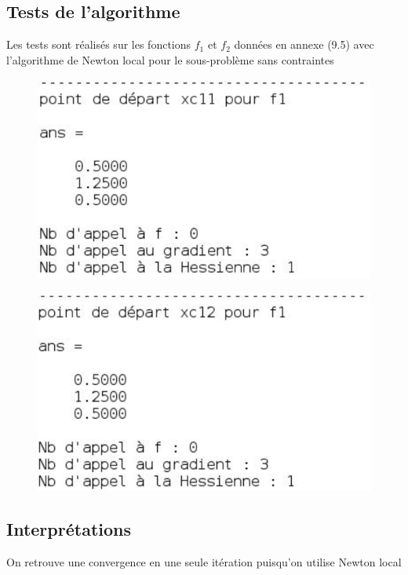 \documentclass[a4paper,12pt]{article}
\theoremstyle{break}
\begin{document}
\subsection{Tests de l'algorithme}
Les tests sont réalisés sur les fonctions $f_1$ et $f_2$ données en annexe (9.5) avec l'algorithme de Newton local pour le sous-problème sans contraintes
\begin{figure}[htbp]
	\centering
		\includegraphics{img/test1_lagrangien_aug.PNG}
\end{figure}
\begin{figure}[htbp]
	\centering
		\includegraphics{img/test2_lagrangien_aug.PNG}
\end{figure}

\newpage
\subsection{Interprétations}
On retrouve une convergence en une seule itération puisqu'on utilise Newton local

\newpage
\end{document}
